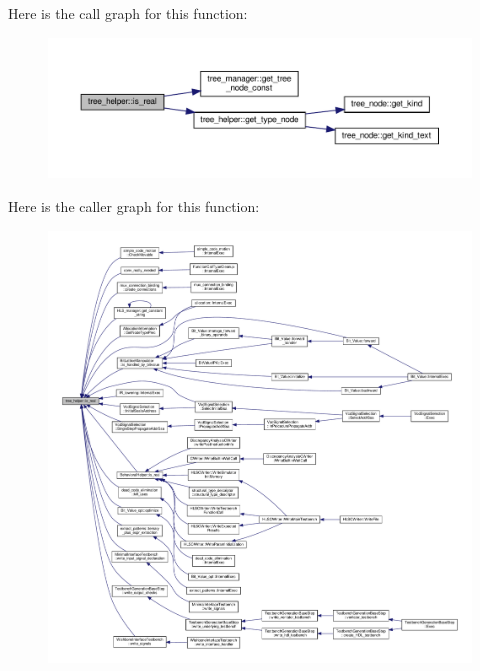 Here is the call graph for this function\+:
\nopagebreak
\begin{figure}[H]
\begin{center}
\leavevmode
\includegraphics[width=350pt]{d7/d99/classtree__helper_a709ed07f7b709f0a6cfd9482aa330414_cgraph}
\end{center}
\end{figure}
Here is the caller graph for this function\+:
\nopagebreak
\begin{figure}[H]
\begin{center}
\leavevmode
\includegraphics[width=350pt]{d7/d99/classtree__helper_a709ed07f7b709f0a6cfd9482aa330414_icgraph}
\end{center}
\end{figure}
\mbox{\label{classtree__helper_a02343f3992681c9b6f614f1d8c3c4c2d}} 
